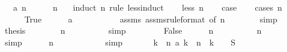\begin{isabellebody}
\ \ \ {\isachardoublequoteopen}a\ n\ {\isachargreater}\ {}{\isachardoublequoteclose}\isanewline
%
\isadelimproof
\ \ %
\endisadelimproof
%
\isatagproof
{}\isamarkupfalse%
\ {\isacharbackquoteopen}n\ {\isasymge}\ {}{\isacharbackquoteclose}\isanewline
{}\isamarkupfalse%
\ {\isacharparenleft}induct\ n\ rule{\isacharcolon}\ less{\isacharunderscore}induct{\isacharparenright}\isanewline
\ \ \isamarkupfalse%
\ {\isacharparenleft}less\ n{\isacharparenright}\isanewline
\ \ \isamarkupfalse%
\ {\isacharquery}case\isanewline
\ \ \isamarkupfalse%
\ {\isacharparenleft}cases\ {\isachardoublequoteopen}n\ {\isacharequal}\ {}{\isachardoublequoteclose}{\isacharparenright}\isanewline
\ \ \ \ \isamarkupfalse%
\ True\isanewline
\ \ \ \ \isamarkupfalse%
\ {\isachardoublequoteopen}a\ {}\ {\isacharequal}\ {}{\isacharslash}{}{\isachardoublequoteclose}\isanewline
\ \ \ \ \ \ \isamarkupfalse%
\ assms{\isacharparenleft}{}{\isacharparenright}\ assms{\isacharparenleft}{}{\isacharparenright}{\isacharbrackleft}rule{\isacharunderscore}format{\isacharcomma}\ of\ n{\isacharbrackright}\isanewline
\ \ \ \ \ \ \isamarkupfalse%
\ simp\isanewline
\ \ \ \ \isamarkupfalse%
\ {\isacharquery}thesis\isanewline
\ \ \ \ \ \ \isamarkupfalse%
\ {\isacharbackquoteopen}n\ {\isacharequal}\ {}{\isacharbackquoteclose}\isanewline
\ \ \ \ \ \ \isamarkupfalse%
\ simp\isanewline
\ \ \isamarkupfalse%
\isanewline
\ \ \ \ \isamarkupfalse%
\ False\isanewline
\ \ \ \ \isamarkupfalse%
\ {\isachardoublequoteopen}n\ {\isachargreater}\ {}{\isachardoublequoteclose}\isanewline
\ \ \ \ \ \ \isamarkupfalse%
\ {\isacharbackquoteopen}n\ {\isasymge}\ {}{\isacharbackquoteclose}\isanewline
\ \ \ \ \ \ \isamarkupfalse%
\ simp\isanewline
\ \ \ \ \isamarkupfalse%
\ {\isachardoublequoteopen}n\ {\isacharminus}\ {}\ {\isasymge}\ {}{\isachardoublequoteclose}\isanewline
\ \ \ \ \ \ \isamarkupfalse%
\ simp\isanewline
\ \ \ \ \isamarkupfalse%
\ {\isachardoublequoteopen}{\isacharparenleft}{\isasymSum}\ k\ {\isacharless}\ n{\isachardot}\ a\ k\ {\isacharslash}\ {\isacharparenleft}n\ {\isacharminus}\ k{\isacharparenright}{\isacharparenright}\ {\isacharequal}\ {}{\isachardoublequoteclose}\ {\isacharparenleft}\ {\isachardoublequoteopen}{\isacharquery}S{}\ {\isacharequal}\ {}{\isachardoublequoteclose}{\isacharparenright}\isanewline

\end{isabellebody}

